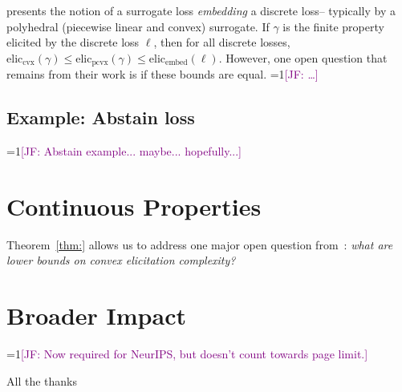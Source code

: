 \documentclass{article}
\newcommand{\Comments}{1}
\newcommand{\mynote}[2]{\ifnum\Comments=1\textcolor{#1}{#2}\fi}
\newcommand{\jessie}[1]{\mynote{purple}{[JF: #1]}}
\newcommand{\eliccvx}{\mathrm{elic}_\mathrm{cvx}}
\newcommand{\elicpoly}{\mathrm{elic}_\mathrm{pcvx}}
\newcommand{\elicembed}{\mathrm{elic}_\mathrm{embed}}
\begin{document}
\cite{finocchiaro2019embedding} presents the notion of a surrogate loss \emph{embedding} a discrete loss-- typically by a polyhedral (piecewise linear and convex) surrogate.
If $\gamma$ is the finite property elicited by the discrete loss $\ell$, then for all discrete losses, $\eliccvx(\gamma) \leq \elicpoly(\gamma) \leq \elicembed(\ell)$.
However, one open question that remains from their work is if these bounds are equal. \jessie{\ldots} 

\subsection{Example: Abstain loss}
\jessie{Abstain example... maybe... hopefully...}

\section{Continuous Properties}\label{sec:contin-consis}
Theorem~\ref{thm:} allows us to address one major open question from~\cite{frongillo2015elicitation}: \emph{what are lower bounds on convex elicitation complexity?}


\newpage

\section*{Broader Impact}
\jessie{Now required for NeurIPS, but doesn't count towards page limit.}

\begin{ack}
All the thanks
\end{ack}



\end{document}
